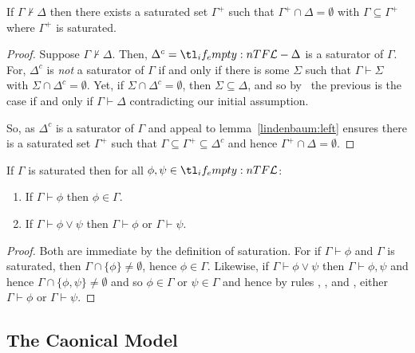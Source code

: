 \documentclass[10pt]{article}
\begin{document}
\begin{corollary}[Saturation]\label{col:saturation}
  If \(\Gamma \nvdash \Delta\) then there exists a saturated set \(\Gamma^{+}\) such that \(\Gamma^{+} \cap \Delta = \emptyset\) with \(\Gamma \subseteq \Gamma^{+}\) where \(\Gamma^{+}\) is saturated.
  \begin{proof}
        Suppose \(\Gamma \nvdash \Delta\).
    Then, \(\Delta^{c} = \olang{} - \Delta\) is a saturator of \(\Gamma\).
    For, \(\Delta^{c}\) is \emph{not} a saturator of \(\Gamma\) if and only if there is some \(\Sigma\) such that \(\Gamma \vdash \Sigma\) with \(\Sigma \cap \Delta^{c} = \emptyset\).
    Yet, if \(\Sigma \cap \Delta^{c} = \emptyset\), then \(\Sigma \subseteq \Delta\), and so by \ the previous is the case if and only if \(\Gamma \vdash \Delta\) contradicting our initial assumption.

    So, as \(\Delta^{c}\) is a saturator of \(\Gamma\) and appeal to lemma~\ref{lindenbaum:left} ensures there is a saturated set \(\Gamma^{+}\) such that \(\Gamma \subseteq \Gamma^{+} \subseteq \Delta^{c}\) and hence \(\Gamma^{+} \cap \Delta = \emptyset\).
  \end{proof}
\end{corollary}

\begin{proposition}
  If \(\Gamma\) is saturated then for all \(\phi,\psi \in \olang{}\):
  \begin{enumerate}
  \item If \(\Gamma \vdash \phi\) then \(\phi \in \Gamma\).
  \item If \(\Gamma \vdash \phi \lor \psi\) then \(\Gamma \vdash \phi\) or \(\Gamma \vdash \psi\).
  \end{enumerate}
  \begin{proof}
    Both are immediate by the definition of saturation.
    For if \(\Gamma \vdash \phi\) and \(\Gamma\) is saturated, then \(\Gamma \cap \{\phi\} \ne \emptyset\), hence \(\phi \in \Gamma\).
    Likewise, if \(\Gamma \vdash \phi \lor \psi\) then \(\Gamma \vdash \phi, \psi\) and hence \(\Gamma \cap \{\phi,\psi\} \ne \emptyset\) and so \(\phi \in \Gamma\) or \(\psi \in \Gamma\) and hence by rules , , and , either \(\Gamma \vdash \phi\) or \(\Gamma \vdash \psi\).
  \end{proof}
\end{proposition}

\subsection{The Caonical Model}
\label{sec:caonical-model}
\end{document}
